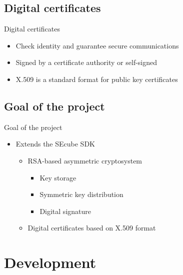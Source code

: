 \documentclass[aspectratio=169]{beamer}
\begin{document}
\subsection{Digital certificates}
\begin{frame}{Digital certificates}
	\begin{itemize}
		\item Check identity and guarantee secure communications
		\item Signed by a certificate authority or self-signed
		\item X.509 is a standard format for public key certificates
	\end{itemize}
\end{frame}

\subsection{Goal of the project}
\begin{frame}{Goal of the project}
	\begin{itemize}
		\item Extends the SEcube SDK
			\begin{itemize}
				\item RSA-based asymmetric cryptosystem 
					\begin{itemize}
						\item Key storage
						\item Symmetric key distribution
						\item Digital signature
					\end{itemize}
				\item Digital certificates based on X.509 format
			\end{itemize}
	\end{itemize}
\end{frame}

\section{Development}
\end{document}
